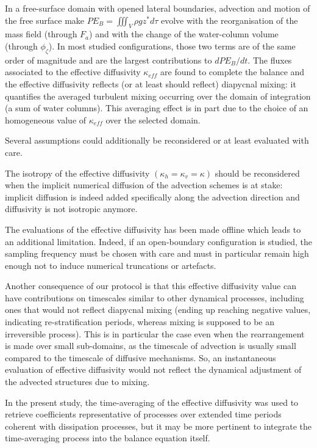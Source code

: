 In a free-surface domain with opened lateral boundaries, advection and motion of the free surface make $PE_B=\iiint_V \rho g z^* d\tau$ evolve with the reorganisation of the mass field (through $F_a$) and with the change of the water-column volume (through $\phi_{\zeta}$). In most studied configurations, those two terms are of the same order of magnitude and are the largest contributions to $dPE_B/dt$. The fluxes associated to the effective diffusivity $\kappa_{eff}$ are found to complete the balance and the effective diffusivity reflects (or at least should reflect) diapycnal mixing: it quantifies the averaged turbulent mixing occurring over the domain of integration (a sum of water columns). 
This averaging effect is in part due to the choice of an homogeneous value of $\kappa_{eff}$ over the selected domain. 

Several assumptions could additionally be reconsidered or at least evaluated with care.

The isotropy of the effective diffusivity $(\kappa_h=\kappa_v=\kappa)$ should be reconsidered when the implicit numerical diffusion of the advection schemes is at stake: implicit diffusion is indeed added specifically along the advection direction and diffusivity is not isotropic anymore.

The evaluations of the effective diffusivity has been made offline which leads to an additional limitation. Indeed, if an open-boundary configuration is studied, the sampling frequency must be chosen with care and must in particular remain high enough not to induce numerical truncations or artefacts.


Another consequence of our protocol is that this effective diffusivity value can have contributions on timescales similar to other dynamical processes, including ones that would not reflect diapycnal mixing (ending up reaching negative values, indicating re-stratification periods, whereas mixing is supposed to be an irreversible process). This is in particular the case even when the rearrangement is made over small sub-domains, as the timescale of advection is usually small compared to the timescale of diffusive mechanisms. So, an instantaneous evaluation of effective diffusivity would not reflect the dynamical adjustment of the advected structures due to mixing.

In the present study, the time-averaging of the effective diffusivity was used to retrieve coefficients representative of processes over extended time periods coherent with dissipation processes, but it may be more pertinent to integrate the time-averaging process into the balance equation itself.

